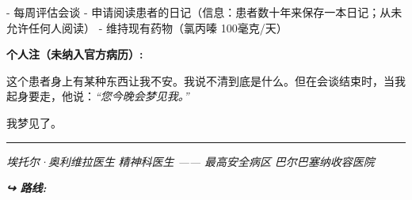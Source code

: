 \noindent - 每周评估会谈
- 申请阅读患者的日记（信息：患者数十年来保存一本日记；从未允许任何人阅读）
- 维持现有药物（氯丙嗪 100毫克/天）

\noindent \textbf{个人注（未纳入官方病历）:}

\noindent 这个患者身上有某种东西让我不安。我说不清到底是什么。但在会谈结束时，当我起身要走，他说：\textit{“您今晚会梦见我。”}

\noindent 我梦见了。

\vspace{0.5em}\noindent\rule{\textwidth}{0.5pt}\vspace{0.5em}

\noindent \textit{埃托尔·奥利维拉医生}
\textit{精神科医生 —— 最高安全病区}
\textit{巴尔巴塞纳收容医院}

\vspace{0.5em}
\noindent\textit{\textbf{↪ 路线:}  \rotasep {} \rotasep {} \rotasep {}}
